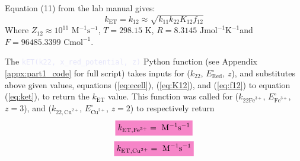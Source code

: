 Equation (11) from the lab manual\autocite{lab_manual} gives:
\begin{equation}
    k_{\text{ET}} = k_{12} \approx \sqrt{k_{11}k_{22}K_{12}f_{12}}
    \label{eq:ket}
\end{equation}
Where $Z_{12} \approx 10^{11} \text{ M}^{-1} \text{s}^{-1}$, $T = 298.15\text{ K}$, $R = 8.3145\text{ Jmol}^{-1}\text{K}^{-1}$and $F = 96485.3399 \text{ Cmol}^{-1}$.
\\
\par The \textcolor{Lavender}{\texttt{kET(k22, x_red_potential, z)}} Python function (see Appendix \ref{appx:part1_code} for full script) takes inputs for ($k_{22}$, $E^{\circ}_{\text{Red}}$, $z$), and substitutes above given values, equations (\ref{eq:ecell}), (\ref{eq:K12}), and (\ref{eq:f12}) to equation (\ref{eq:ket}), to return the $k_{\text{ET}}$ value.
% 
This function was called for ($k_{22 \text{Fe}^{3+}}$, $E^{\circ}_{\text{Fe}^{3+}}$, $z = 3$), and ($k_{22, \text{Cu}^{2+}}$, $E^{\circ}_{\text{Cu}^{2+}}$, $z = 2$) to respectively return
\begin{equation*}
    \mathcolorbox{Lavender}{k_{\text{ET},\text{Fe}^{3+}} =  \text{ M}^{-1} \text{s}^{-1}}
\end{equation*}
\begin{equation*}
    \mathcolorbox{Lavender}{k_{\text{ET},\text{Cu}^{2+}} =  \text{ M}^{-1} \text{s}^{-1}}
\end{equation*}
